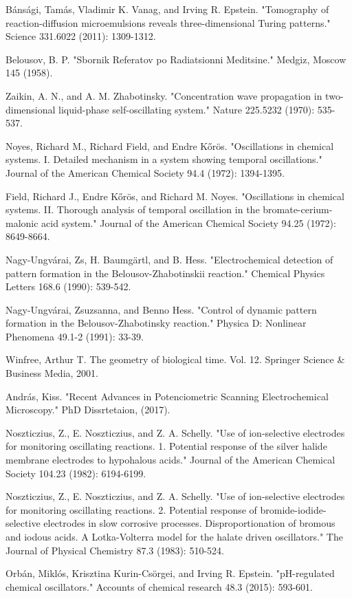 \documentclass[3p, twocolumn]{elsarticle}
\begin{document}
\begin{thebibliography}{5}
Bánsági, Tamás, Vladimir K. Vanag, and Irving R. Epstein. "Tomography of reaction-diffusion microemulsions reveals three-dimensional Turing patterns." Science 331.6022 (2011): 1309-1312.

Belousov, B. P. "Sbornik Referatov po Radiatsionni Meditsine." Medgiz, Moscow 145 (1958).

Zaikin, A. N., and A. M. Zhabotinsky. "Concentration wave propagation in two-dimensional liquid-phase self-oscillating system." Nature 225.5232 (1970): 535-537.

Noyes, Richard M., Richard Field, and Endre Kőrös. "Oscillations in chemical systems. I. Detailed mechanism in a system showing temporal oscillations." Journal of the American Chemical Society 94.4 (1972): 1394-1395.

Field, Richard J., Endre Kőrös, and Richard M. Noyes. "Oscillations in chemical systems. II. Thorough analysis of temporal oscillation in the bromate-cerium-malonic acid system." Journal of the American Chemical Society 94.25 (1972): 8649-8664.


Nagy-Ungvárai, Zs, H. Baumgärtl, and B. Hess. "Electrochemical detection of pattern formation in the Belousov-Zhabotinskii reaction." Chemical Physics Letters 168.6 (1990): 539-542. 

Nagy-Ungvárai, Zsuzsanna, and Benno Hess. "Control of dynamic pattern formation in the Belousov-Zhabotinsky reaction." Physica D: Nonlinear Phenomena 49.1-2 (1991): 33-39.

Winfree, Arthur T. The geometry of biological time. Vol. 12. Springer Science \& Business Media, 2001.

András, Kiss. "Recent Advances in Potenciometric Scanning Electrochemical Microscopy." PhD Dissrtetaion, (2017).

Noszticzius, Z., E. Noszticzius, and Z. A. Schelly. "Use of ion-selective electrodes for monitoring oscillating reactions. 1. Potential response of the silver halide membrane electrodes to hypohalous acids." Journal of the American Chemical Society 104.23 (1982): 6194-6199.

Noszticzius, Z., E. Noszticzius, and Z. A. Schelly. "Use of ion-selective electrodes for monitoring oscillating reactions. 2. Potential response of bromide-iodide-selective electrodes in slow corrosive processes. Disproportionation of bromous and iodous acids. A Lotka-Volterra model for the halate driven oscillators." The Journal of Physical Chemistry 87.3 (1983): 510-524.

Orbán, Miklós, Krisztina Kurin-Csörgei, and Irving R. Epstein. "pH-regulated chemical oscillators." Accounts of chemical research 48.3 (2015): 593-601.
\end{thebibliography}
\end{document}

